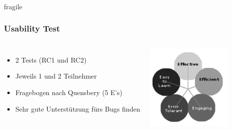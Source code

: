 \documentclass[10pt, compress]{beamer}
\begin{document}
\begin{frame}{fragile}
  \frametitle{Usability Test}
  \begin{columns}[onlytextwidth]
  \begin{itemize}
    \item 2 Tests (RC1 und RC2)
    \item Jeweils 1 und 2 Teilnehmer
    \item Fragebogen nach Quensbery (5 E's)
    \item Sehr gute Unterstützung fürs Bugs finden
  \end{itemize}
  
  \begin{center}
    \includegraphics[width=0.8\textwidth]{quesenbery}
  \end{center}
   
  \end{columns}
\end{frame}

\end{document}

